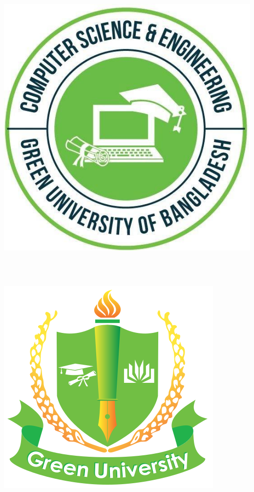 
\noindent
\begin{minipage}{2cm}
\includegraphics[width=\textwidth]{Images/CSE_GUB_logo}
\end{minipage}
\hfill
\begin{minipage}{13.5cm}
\begin{center}
\Huge{\textsc{\gub}}\\
\Large{\dept}\\
\vspace{0.1cm}
\end{center}
\end{minipage}
\hfill
\begin{minipage}{2cm}
\includegraphics[width=\textwidth]{Images/GUB_logo}
\end{minipage}
\medskip


